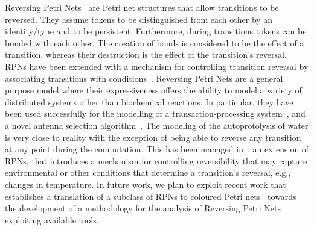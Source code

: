 \documentclass[runningheads]{llncs}
\begin{document}
Reversing Petri Nets~\cite{RPNs} are 
Petri net structures that allow transitions to be reversed. They assume 
tokens to be distinguished from each other by an identity/type and to be persistent. Furthermore,
during transitions tokens can be bonded with each other. The creation of bonds
is considered to be the effect of a transition, whereas their destruction is the effect of
the transition's reversal. RPNs
have been extended with a mechanism for controlling transition
reversal by associating transitions with conditions~\cite{RC19}. Reversing Petri Nets are a general purpose model where their expressiveness offers the ability to model 
a variety of distributed systems other than biochemical reactions. In particular, they have been used successfully for
the modelling of a transaction-processing system~\cite{RPNs}, and a novel antenna selection  algorithm~\cite{RC19}. The modeling of the autoprotolysis of water is very close to reality with the exception of being able to reverse any transition at any point during the computation. This has been managed in~\cite{RC19}, an extension of RPNs, that introduces
a mechanism for controlling reversibility 
 that may capture environmental or other conditions that determine a transition's
reversal, e.g., changes in temperature. In future work, we plan to exploit recent work that establishes a translation of a subclass of RPNs to coloured Petri nets~\cite{RPNtoCPN} towards the development of a methodology for the analysis of Reversing Petri Nets exploiting available tools.
\end{document}
